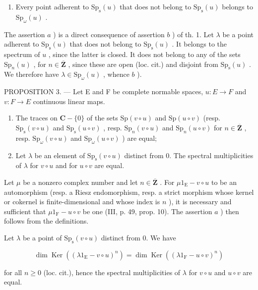 \begin{enumerate}
\def\labelenumi{\alph{enumi})}
\setcounter{enumi}{1}
\tightlist
\item
  Every point adherent to \(\mathrm{Sp}_{\mathrm{s}}(u)\) that does not belong to \(\mathrm{Sp}_{\mathrm{s}}(u)\) belongs to \(\mathrm{Sp}_{\omega}(u)\) .
\end{enumerate}

The assertion \(a\) ) is a direct consequence of assertion \(b\) ) of th. 1. Let \(\lambda\) be a point adherent to \(\mathrm{Sp}_{\mathrm{s}}(u)\) that does not belong to \(\mathrm{Sp}_{\mathrm{s}}(u)\) . It belongs to the spectrum of \(u\) , since the latter is closed. It does not belong to any of the sets \(\mathrm{Sp}_{n}(u)\) , for \(n \in \overline{\mathbf{Z}}\) , since these are open (loc. cit.) and disjoint from \(\mathrm{Sp}_{\mathrm{s}}(u)\) . We therefore have \(\lambda \in \mathrm{Sp}_{\omega}(u)\) , whence \(b\) ).

PROPOSITION 3. --- Let E and F be complete normable spaces, \(u\colon E\to F\) and \(v\colon F\to E\) continuous linear maps.

\begin{enumerate}
\def\labelenumi{\alph{enumi})}
\item
  The traces on \(\mathbf{C} - \{0\}\) of the sets \(\mathrm{Sp}(v \circ u)\) and \(\mathrm{Sp}(u \circ v)\) (resp. \(\mathrm{Sp}_{\mathrm{s}}(v \circ u)\) and \(\mathrm{Sp}_{\mathrm{s}}(u \circ v)\) , resp. \(\mathrm{Sp}_{n}(v \circ u)\) and \(\mathrm{Sp}_{n}(u \circ v)\) for \(n \in \overline{\mathbf{Z}}\) , resp. \(\mathrm{Sp}_{\omega}(v \circ u)\) and \(\mathrm{Sp}_{\omega}(u \circ v)\) ) are equal;
\item
  Let \(\lambda\) be an element of \(\mathrm{Sp}_{\mathrm{s}}(v \circ u)\) distinct from 0. The spectral multiplicities of \(\lambda\) for \(v \circ u\) and for \(u \circ v\) are equal.
\end{enumerate}

Let \(\mu\) be a nonzero complex number and let \(n \in \overline{\mathbf{Z}}\) . For \(\mu 1_{\mathrm{E}} - v \circ u\) to be an automorphism (resp. a Riesz endomorphism, resp. a strict morphism whose kernel or cokernel is finite-dimensional and whose index is \(n\) ), it is necessary and sufficient that \(\mu 1_{\mathrm{F}} - u \circ v\) be one (III, p. 49, prop. 10). The assertion \(a\) ) then follows from the definitions.

Let \(\lambda\) be a point of \(\mathrm{Sp}_{\mathrm{s}}(v \circ u)\) distinct from 0. We have

\[
\dim \operatorname{Ker} ((\lambda 1 _ {\mathrm{E}} - v \circ u) ^ {n}) = \dim \operatorname{Ker} ((\lambda 1 _ {\mathrm{F}} - u \circ v) ^ {n})
\]

for all \(n \geqslant 0\) (loc. cit.), hence the spectral multiplicities of \(\lambda\) for \(v \circ u\) and \(u \circ v\) are equal.


